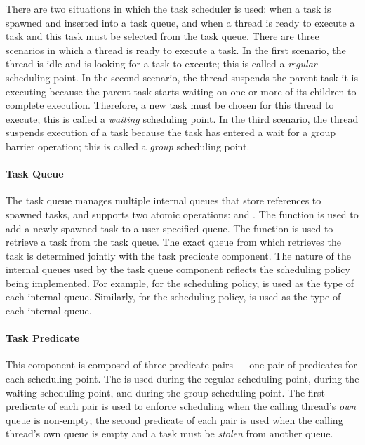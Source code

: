 There are two situations in which the task scheduler is used: when a task
is spawned and inserted into a task queue, and when a thread is ready to
execute a task and this task must be selected from the task queue.
%
There are three scenarios in which a thread is ready to execute a task. 
%
In the first scenario, the thread is idle and is looking for a task to execute; 
this is called a \emph{regular} scheduling point.
%
In the second scenario, the thread suspends the parent task it is executing
because the parent task starts waiting on one or more of its children to
complete execution.  
%
Therefore, a new task must be chosen for this thread to execute; this is called
a \emph{waiting} scheduling point.
%
In the third scenario, the thread suspends execution of a task because the task
has entered a wait for a group barrier operation; this is called a \emph{group}
scheduling point.
%

\paragraph{Task Queue}
%
The task queue manages multiple internal queues that store references to
spawned tasks, and supports two atomic operations:  and .
%
The  function is used to add a newly spawned task to a user-specified
queue.
%
The  function is used to retrieve a task from the task queue. 
%
The exact queue from which  retrieves the task is determined jointly
with the task predicate component. 
%
The nature of the internal queues used by the task queue component reflects the
scheduling policy being implemented.
%
For example, for the  scheduling policy,  is used
as the type of each internal queue.
%
Similarly, for the  scheduling policy,  is used
as the type of each internal queue.

\paragraph{Task Predicate}
%
This component is composed of three predicate pairs --- one pair of predicates
for each scheduling point. 
%
The  is used during the regular scheduling
point,  during the waiting scheduling point, and
 during the group scheduling point.
%
The first predicate of each pair is used to enforce scheduling when the calling
thread's \emph{own} queue is non-empty; the second predicate of each pair is
used when the calling thread's own queue is empty and a task must be
\emph{stolen} from another queue.
 
